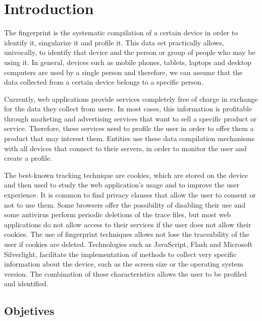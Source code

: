 \chapter{Introduction}

The fingerprint is the systematic compilation of a certain device in order to identify it, singularize it and profile it. This data set practically allows, univocally, to identify that device and the person or group of people who may be using it. In general, devices such as mobile phones, tablets, laptops and desktop computers are used by a single person and therefore, we can assume that the data collected from a certain device belongs to a specific person. \par

Currently, web applications provide services completely free of charge in exchange for the data they collect from users. In most cases, this information is profitable through marketing and advertising services that want to sell a specific product or service. Therefore, these services need to profile the user in order to offer them a product that may interest them. Entities use these data compilation mechanisms with all devices that connect to their servers, in order to monitor the user and create a profile. \par

The best-known tracking technique are cookies, which are stored on the device and then used to study the web application's usage and to improve the user experience. It is common to find privacy clauses that allow the user to consent or not to use them. Some browsers offer the possibility of disabling their use and some antivirus perform periodic deletions of the trace files, but most web applications do not allow access to their services if the user does not allow their cookies. The use of fingerprint techniques allows not lose the traceability of the user if cookies are deleted. Technologies such as JavaScript, Flash and Microsoft Silverlight, facilitate the implementation of methods to collect very specific information about the device, such as the screen size or the operating system version. The combination of these characteristics allows the user to be profiled and identified. \par

\section{Objetives}
 
